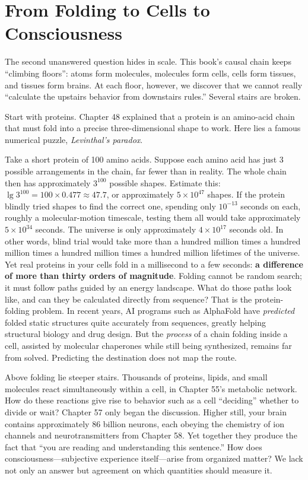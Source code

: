 \section{From Folding to Cells to Consciousness}

The second unanswered question hides in scale. This book's causal chain keeps ``climbing floors'': atoms form molecules, molecules form cells, cells form tissues, and tissues form brains. At each floor, however, we discover that we cannot really ``calculate the upstairs behavior from downstairs rules.'' Several stairs are broken.

Start with proteins. Chapter 48 explained that a protein is an amino-acid chain that must fold into a precise three-dimensional shape to work. Here lies a famous numerical puzzle, \emph{Levinthal's paradox}.

\begin{qiaoliang}
Take a short protein of 100 amino acids. Suppose each amino acid has just 3 possible arrangements in the chain, far fewer than in reality. The whole chain then has approximately $3^{100}$ possible shapes. Estimate this: $\lg 3^{100} = 100 \times 0.477 \approx 47.7$, or approximately $5\times 10^{47}$ shapes. If the protein blindly tried shapes to find the correct one, spending only $10^{-13}$ seconds on each, roughly a molecular-motion timescale, testing them all would take approximately $5\times 10^{34}$ seconds. The universe is only approximately $4\times 10^{17}$ seconds old. In other words, blind trial would take more than a hundred million times a hundred million times a hundred million times a hundred million lifetimes of the universe. Yet real proteins in your cells fold in a millisecond to a few seconds: \textbf{a difference of more than thirty orders of magnitude}. Folding cannot be random search; it must follow paths guided by an energy landscape. What do those paths look like, and can they be calculated directly from sequence? That is the protein-folding problem. In recent years, AI programs such as AlphaFold have \emph{predicted} folded static structures quite accurately from sequences, greatly helping structural biology and drug design. But the \emph{process} of a chain folding inside a cell, assisted by molecular chaperones while still being synthesized, remains far from solved. Predicting the destination does not map the route.
\end{qiaoliang}

Above folding lie steeper stairs. Thousands of proteins, lipids, and small molecules react simultaneously within a cell, in Chapter 55's metabolic network. How do these reactions give rise to behavior such as a cell ``deciding'' whether to divide or wait? Chapter 57 only began the discussion. Higher still, your brain contains approximately 86 billion neurons, each obeying the chemistry of ion channels and neurotransmitters from Chapter 58. Yet together they produce the fact that ``you are reading and understanding this sentence.'' How does consciousness---subjective experience itself---arise from organized matter? We lack not only an answer but agreement on which quantities should measure it.


